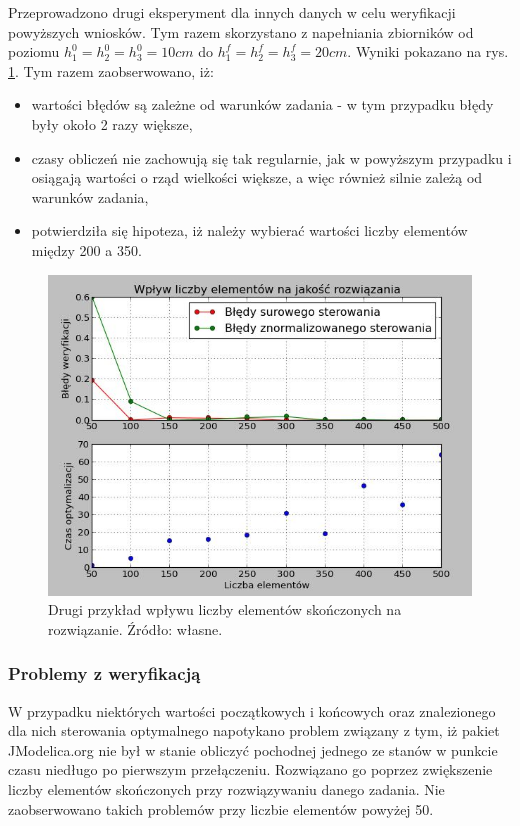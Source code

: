 Przeprowadzono drugi eksperyment dla innych danych w celu weryfikacji powyższych wniosków. Tym razem skorzystano z napełniania zbiorników od poziomu $h_{1}^{0} = h_{2}^{0} = h_{3}^{0} = 10 cm$ do $h_{1}^{f} = h_{2}^{f} = h_{3}^{f} = 20 cm$. Wyniki pokazano na rys. \ref{fig:elementsinfluence10-2050-500}. Tym razem zaobserwowano, iż:
\begin{itemize}
    \item wartości błędów są zależne od warunków zadania - w tym przypadku błędy były około 2 razy większe,
    \item czasy obliczeń nie zachowują się tak regularnie, jak w powyższym przypadku i osiągają wartości o rząd wielkości większe, a więc również silnie zależą od warunków zadania,
    \item potwierdziła się hipoteza, iż należy wybierać wartości liczby elementów między 200 a 350.
\end{itemize}

\begin{figure}[ht]
    \centering
    \includegraphics{Grafika/elements_influence_10-20_50-500}
    \caption{Drugi przykład wpływu liczby elementów skończonych na rozwiązanie. Źródło: własne.}
    \label{fig:elementsinfluence10-2050-500}
\end{figure}

\subsubsection{Problemy z weryfikacją}

W przypadku niektórych wartości początkowych i końcowych oraz znalezionego dla nich sterowania optymalnego napotykano problem związany z tym, iż pakiet JModelica.org nie był w stanie obliczyć pochodnej jednego ze stanów w punkcie czasu niedługo po pierwszym przełączeniu. Rozwiązano go poprzez zwiększenie liczby elementów skończonych przy rozwiązywaniu danego zadania. Nie zaobserwowano takich problemów przy liczbie elementów powyżej 50.

